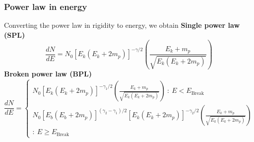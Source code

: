 \documentclass{beamer}
\begin{document}
\begin{frame}
\frametitle{Power law in energy}
Converting the power law in rigidity to energy, we obtain
\textbf{Single power law (SPL)}
\begin{equation*}
\frac{dN}{dE} = N_0[E_k(E_k+2m_p)]^{-\gamma/2} \left(\frac{E_k+m_p}{\sqrt{E_k(E_k+2m_p)}}\right)
\end{equation*}
\textbf{Broken power law (BPL)}
\begin{equation*}
\frac{dN}{dE}=
  \begin{cases}
    N_0[E_k(E_k+2m_p)]^{-\gamma_1/2} \left(\frac{E_k+m_p}{\sqrt{E_k(E_k+2m_p)}}\right)\ :\ E < E_{\text{Break}}\\
    N_0[E_b(E_b+2m_p)]^{(\gamma_2-\gamma_1)/2}[E_k(E_k+2m_p)]^{-\gamma_2/2} \left(\frac{E_k+m_p}{\sqrt{E_k(E_k+2m_p)}}\right)\\ :\ E \ge E_{\text{Break}}
  \end{cases}
\end{equation*}
\end{frame}
\end{document}
